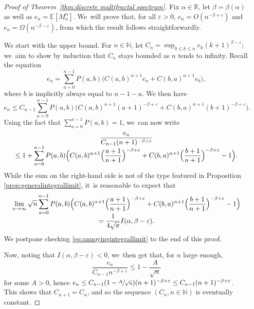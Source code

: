 \documentclass[11pt]{article}
\newcommand{\E}{\mathbb{E}}
\newcommand{\R}{{\mathbb{R}}}
\newcommand{\N}{\mathbb{N}}
\let\veps\varepsilon
\theoremstyle{definition}
\begin{document}
\begin{proof}[Proof of Theorem~\ref{thm:discrete multifractal spectrum}]Fix $\alpha\in\R$, let $\beta=\beta(\alpha)$ as well as $e_n=\E[M_n^\alpha]$. We~will prove that, for all $\veps>0$, $e_n=O(n^{-\beta+\veps})$ and $e_n=\Omega(n^{-\beta-\veps})$, from which the result follows straightforwardly.

We start with the upper bound. For $n\in\N$, let $C_n=\sup_{0\leq k\leq n}e_k (k+1)^{\beta-\veps};$ we~aim to show by induction that $C_n$ stays bounded as $n$ tends to infinity. Recall the equation\vspace*{-3pt}
\[
e_n=\sum_{a=0}^{n-1}P(a,b)\bigl(C(a,b)^{\alpha+1}e_a+C(b,a)^{\alpha+1}e_b\bigr),
\]
where $b$ is implicitly always equal to $n-1-a$. We then have\vspace*{-3pt}
\[
e_n\leq C_{n-1} \sum_{a=0}^{n-1}P(a,b)\bigl(C(a,b)^{\alpha+1}(a+1)^{-\beta+\veps}+C(b,a)^{\alpha+1}(b+1)^{-\beta+\veps}\bigr).
\]
Using the fact that $\sum_{a=0}^{n-1} P(a,b)=1$, we~can now write\vspace*{-5pt}
\begin{multline*}
\frac{e_n}{C_{n-1}(n+1)^{-\beta+\veps}}\\[-5pt]
\leq 1+ \sum_{a=0}^{n-1}P(a,b)\Bigl(C(a,b)^{\alpha+1}\Bigl(\frac{a+1}{n+1}\Bigr)^{-\beta+\veps}+C(b,a)^{\alpha+1}\Bigl(\frac{b+1}{n+1}\Bigr)^{-\beta+\veps}-1\Bigr).
\end{multline*}
While the sum on the right-hand side is not of the type featured in Proposition \ref{prop:generalintegrallimit}, it~is reasonable to expect that\vspace*{-5pt}
\begin{multline}\label{eq:annoyingintegrallimit}
\lim_{n\to\infty} \sqrt{n}\sum_{a=0}^{n-1}P(a,b)\Bigl(C(a,b)^{\alpha+1}\Bigl(\frac{a+1}{n+1}\Bigr)^{-\beta+\veps}+C(b,a)^{\alpha+1}\Bigl(\frac{b+1}{n+1}\Bigr)^{-\beta+\veps}-1\Bigr)\\[-5pt]
=\frac1{4\sqrt{\pi}}I(\alpha,\beta-\veps).
\end{multline}
We postpone checking \eqref{eq:annoyingintegrallimit} to the end of this proof.

Now, noting that $I(\alpha,\beta-\veps)<0$, we~then get that, for $n$ large enough,\vspace*{-3pt}
\[
\frac{e_n}{C_{n-1}n^{-\beta+\veps}}\leq 1-\frac{A}{\sqrt{n}}
\]
for some $A>0$, hence
$e_n\leq C_{n-1}(1-\sfrac{A}{\sqrt{n}})(n+1)^{-\beta+\veps}\leq C_{n-1}(n+1)^{-\beta+\veps}$.
This shows that $C_{n+1}=C_n$, and so the sequence $(C_n,n\in\N)$ is eventually constant.


\end{proof}
\end{document}
